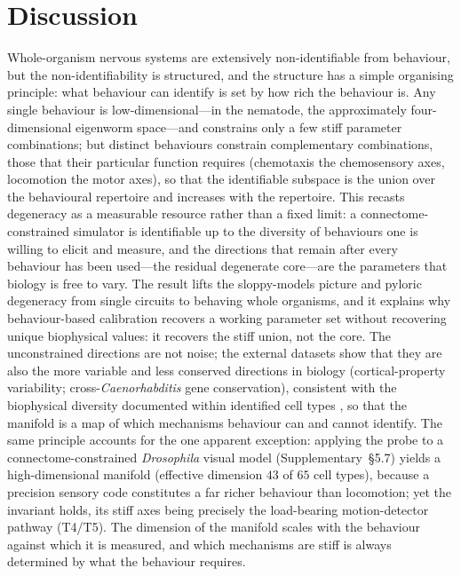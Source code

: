 \documentclass[11pt]{article}
\begin{document}
\section*{Discussion}
Whole-organism nervous systems are extensively non-identifiable from behaviour, but the non-identifiability is structured, and the structure has a simple organising principle: what behaviour can identify is set by how rich the behaviour is. Any single behaviour is low-dimensional---in the nematode, the approximately four-dimensional eigenworm space---and constrains only a few stiff parameter combinations; but distinct behaviours constrain complementary combinations, those that their particular function requires (chemotaxis the chemosensory axes, locomotion the motor axes), so that the identifiable subspace is the union over the behavioural repertoire and increases with the repertoire. This recasts degeneracy as a measurable resource rather than a fixed limit: a connectome-constrained simulator is identifiable up to the diversity of behaviours one is willing to elicit and measure, and the directions that remain after every behaviour has been used---the residual degenerate core---are the parameters that biology is free to vary. The result lifts the sloppy-models picture \citep{gutenkunst2007universally,transtrum2015perspective,sethna2010sloppy} and pyloric degeneracy \citep{prinz2004similar,marder2011variability} from single circuits to behaving whole organisms, and it explains why behaviour-based calibration recovers a working parameter set without recovering unique biophysical values: it recovers the stiff union, not the core. The unconstrained directions are not noise; the external datasets show that they are also the more variable and less conserved directions in biology (cortical-property variability; cross-\emph{Caenorhabditis} gene conservation), consistent with the biophysical diversity documented within identified cell types \citep{gjorgjieva2016computational,oconnor2024neural}, so that the manifold is a map of which mechanisms behaviour can and cannot identify. The same principle accounts for the one apparent exception: applying the probe to a connectome-constrained \emph{Drosophila} visual model (Supplementary~\S5.7) yields a high-dimensional manifold (effective dimension $43$ of $65$ cell types), because a precision sensory code constitutes a far richer behaviour than locomotion; yet the invariant holds, its stiff axes being precisely the load-bearing motion-detector pathway (T4/T5). The dimension of the manifold scales with the behaviour against which it is measured, and which mechanisms are stiff is always determined by what the behaviour requires.
\end{document}
